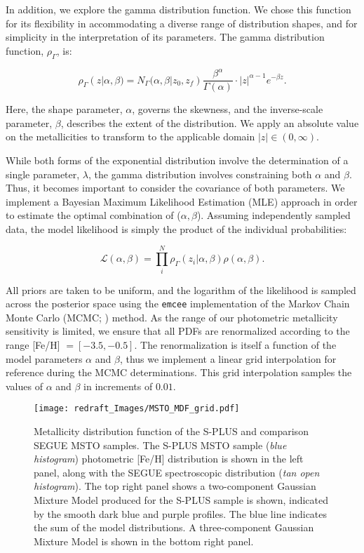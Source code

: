 \documentclass[twocolumn,trackchanges]{aastex63}
\begin{document}
In addition, we explore the gamma distribution function. We chose this function for its flexibility in accommodating a diverse range of distribution shapes, and for simplicity in the interpretation of its parameters. The gamma distribution function, $\rho_{\Gamma}$, is:

\begin{equation}\label{eq:beta_pdf}
    \rho_{\Gamma}(z | \alpha, \beta) = N_{\Gamma}(\alpha, \beta | z_0, z_f) \frac{\beta^{\alpha}}{\Gamma(\alpha)} \cdot |z|^{\alpha - 1}e^{- \beta z}.
\end{equation}

\noindent Here, the shape parameter, $\alpha$, governs the skewness, and the inverse-scale parameter, $\beta$, describes the extent of the distribution. We apply an absolute value on the metallicities to transform to the applicable domain $|z| \in (0,\infty)$. 

While both forms of the exponential distribution involve the determination of a single parameter, $\lambda$, the gamma distribution involves constraining both $\alpha$ and $\beta$. Thus, it becomes important to consider the covariance of both parameters. We implement a Bayesian Maximum Likelihood Estimation (MLE) approach in order to estimate the optimal combination of ($\alpha, \beta$). Assuming independently sampled data, the model likelihood is simply the product of the individual probabilities:

\begin{equation}
\mathcal{L}(\alpha, \beta) = \prod_{i}^{N} \rho_{\Gamma}(z_{i} | \alpha, \beta) \rho(\alpha, \beta).
\end{equation}

\noindent 
All priors are taken to be uniform, and the logarithm of the likelihood is sampled across the posterior space using the \texttt{emcee} \citep{emcee} implementation of the Markov Chain Monte Carlo (MCMC; \citealt{Goodman:2010}) method. 
As the range of our photometric metallicity sensitivity is limited, we ensure that all PDFs are renormalized according to the range [Fe/H] $=[-3.5, -0.5]$. The renormalization is itself a function of the model parameters $\alpha$ and $\beta$, thus we implement a linear grid interpolation for reference during the MCMC determinations. This grid interpolation samples the values of $\alpha$ and $\beta$ in increments of $0.01$.

\begin{figure*}
	\centering
	\texttt{[image: redraft\_Images/MSTO\_MDF\_grid.pdf]}
	
	\caption{Metallicity distribution function of the S-PLUS and comparison SEGUE MSTO samples.  The S-PLUS MSTO sample (\textit{blue histogram}) photometric [Fe/H] distribution is shown in the left panel, along with the SEGUE spectroscopic distribution (\textit{tan open histogram}). The top right panel shows a two-component Gaussian Mixture Model produced for the S-PLUS sample is shown, indicated by the smooth dark blue and purple profiles. The blue line indicates the sum of the model distributions. A three-component Gaussian Mixture Model is shown in the bottom right panel.
	\label{fig:MSTO_FEH}}
\end{figure*}
\end{document}
